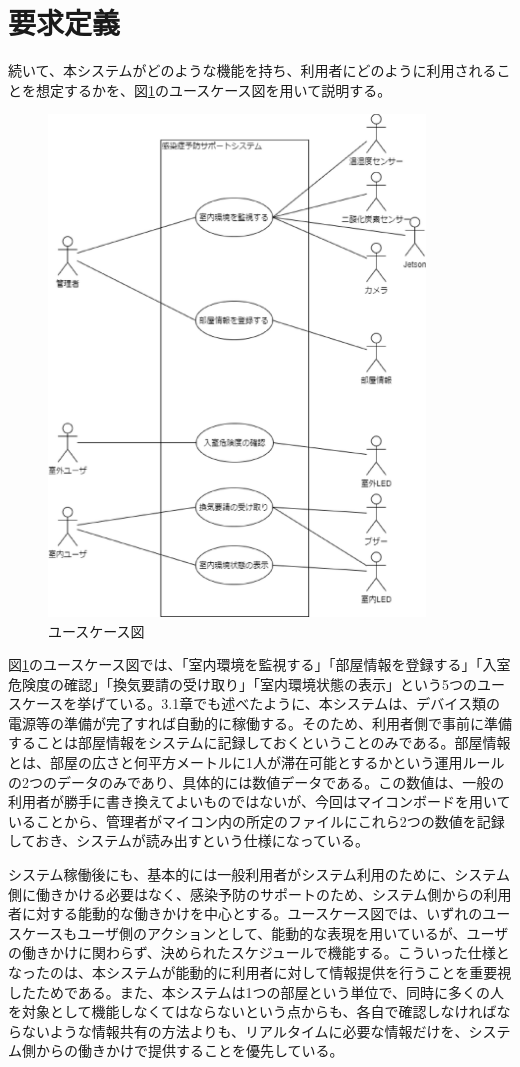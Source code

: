 \section{要求定義}
続いて、本システムがどのような機能を持ち、利用者にどのように利用されることを想定するかを、図\ref{usecase}のユースケース図を用いて説明する。

\begin{figure}[H]
	\centering
	\includegraphics[width=10cm]{usecase.eps}
	\caption{ユースケース図}
	\label{usecase}
\end{figure}

図\ref{usecase}のユースケース図では、「室内環境を監視する」「部屋情報を登録する」「入室危険度の確認」「換気要請の受け取り」「室内環境状態の表示」という5つのユースケースを挙げている。3.1章でも述べたように、本システムは、デバイス類の電源等の準備が完了すれば自動的に稼働する。そのため、利用者側で事前に準備することは部屋情報をシステムに記録しておくということのみである。部屋情報とは、部屋の広さと何平方メートルに1人が滞在可能とするかという運用ルールの2つのデータのみであり、具体的には数値データである。この数値は、一般の利用者が勝手に書き換えてよいものではないが、今回はマイコンボードを用いていることから、管理者がマイコン内の所定のファイルにこれら2つの数値を記録しておき、システムが読み出すという仕様になっている。

システム稼働後にも、基本的には一般利用者がシステム利用のために、システム側に働きかける必要はなく、感染予防のサポートのため、システム側からの利用者に対する能動的な働きかけを中心とする。ユースケース図では、いずれのユースケースもユーザ側のアクションとして、能動的な表現を用いているが、ユーザの働きかけに関わらず、決められたスケジュールで機能する。こういった仕様となったのは、本システムが能動的に利用者に対して情報提供を行うことを重要視したためである。また、本システムは1つの部屋という単位で、同時に多くの人を対象として機能しなくてはならないという点からも、各自で確認しなければならないような情報共有の方法よりも、リアルタイムに必要な情報だけを、システム側からの働きかけで提供することを優先している。

